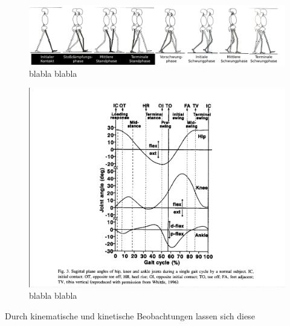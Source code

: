 \begin{figure}
	\centering
	\includegraphics[width=\linewidth]{bilder/Einleitung/Skizze_Gangphasen_small}
	\caption[Gangphasen]{blabla blabla}
	\label{fig:Skizze_Phasen}
\end{figure}

\begin{figure}
	\centering
	\includegraphics[width=0.7\linewidth]{bilder/Einleitung/gangphasen}
	\caption[Gangphasen]{blabla blabla}
	\label{fig:gangphasen}
\end{figure}


 Durch kinematische und kinetische Beobachtungen lassen sich diese 